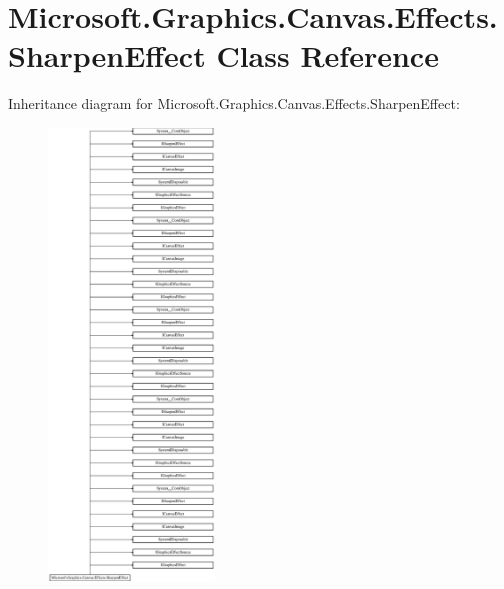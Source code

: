 \hypertarget{class_microsoft_1_1_graphics_1_1_canvas_1_1_effects_1_1_sharpen_effect}{}\section{Microsoft.\+Graphics.\+Canvas.\+Effects.\+Sharpen\+Effect Class Reference}
\label{class_microsoft_1_1_graphics_1_1_canvas_1_1_effects_1_1_sharpen_effect}
Inheritance diagram for Microsoft.\+Graphics.\+Canvas.\+Effects.\+Sharpen\+Effect\+:\begin{figure}[H]
\begin{center}
\leavevmode
\includegraphics[height=12.000000cm]{class_microsoft_1_1_graphics_1_1_canvas_1_1_effects_1_1_sharpen_effect}
\end{center}
\end{figure}
